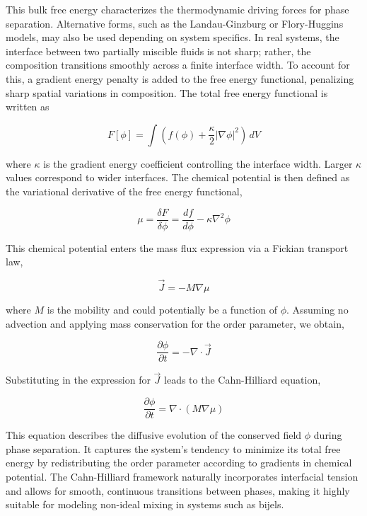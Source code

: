 This bulk free energy characterizes the thermodynamic driving forces for phase separation. Alternative forms, such as the Landau-Ginzburg or Flory-Huggins models, may also be used depending on system 
specifics. In real systems, the interface between two partially miscible fluids is not sharp; rather, the composition transitions smoothly across a finite interface width. To account for this, a 
gradient energy penalty is added to the free energy functional, penalizing sharp spatial variations in composition. The total free energy functional is written as

\begin{equation}
    F[\phi] = \int \left( f(\phi) + \frac{\kappa}{2}|\nabla \phi|^2 \right) \, dV
\end{equation}

where $\kappa$ is the gradient energy coefficient controlling the interface width. Larger \(\kappa\) values correspond to wider interfaces.
The chemical potential is then defined as the variational derivative of the free energy functional,

\begin{equation}
    \mu = \frac{\delta F}{\delta \phi} = \frac{df}{d\phi} - \kappa \nabla^2 \phi
\end{equation}

This chemical potential enters the mass flux expression via a Fickian transport law,

\begin{equation}
    \vec{J} = -M \nabla \mu
\end{equation}

where $M$ is the mobility and could potentially be a function of $\phi$. Assuming no advection and applying mass conservation for the order parameter, we obtain,

\begin{equation}
    \frac{\partial \phi}{\partial t} = -\nabla \cdot \vec{J}
\end{equation}

Substituting in the expression for \(\vec{J}\) leads to the Cahn-Hilliard equation,

\begin{equation}
    \frac{\partial \phi}{\partial t} = \nabla \cdot \left( M \nabla \mu \right)
\end{equation}

This equation describes the diffusive evolution of the conserved field $\phi$ during phase separation. It captures the system's tendency to minimize its total free energy 
by redistributing the order parameter according to gradients in chemical potential. The Cahn-Hilliard framework naturally incorporates interfacial tension and allows for smooth, 
continuous transitions between phases, making it highly suitable for modeling non-ideal mixing in systems such as bijels.

